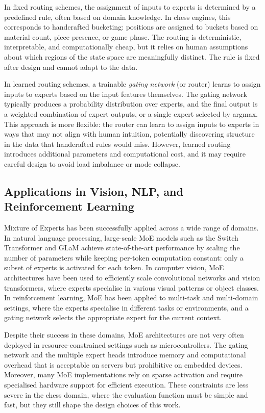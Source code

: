 In fixed routing schemes, the assignment of inputs to experts is determined by a predefined rule, often based on domain knowledge. In chess engines, this corresponds to handcrafted bucketing: positions are assigned to buckets based on material count, piece presence, or game phase. The routing is deterministic, interpretable, and computationally cheap, but it relies on human assumptions about which regions of the state space are meaningfully distinct. The rule is fixed after design and cannot adapt to the data.

In learned routing schemes, a trainable \emph{gating network} (or router) learns to assign inputs to experts based on the input features themselves. The gating network typically produces a probability distribution over experts, and the final output is a weighted combination of expert outputs, or a single expert selected by argmax. This approach is more flexible: the router can learn to assign inputs to experts in ways that may not align with human intuition, potentially discovering structure in the data that handcrafted rules would miss. However, learned routing introduces additional parameters and computational cost, and it may require careful design to avoid load imbalance or mode collapse.


\subsection{Applications in Vision, NLP, and Reinforcement Learning}
Mixture of Experts has been successfully applied across a wide range of domains. In natural language processing, large-scale MoE models such as the Switch Transformer \parencite{fedus2021} and GLaM \parencite{du2022} achieve state-of-the-art performance by scaling the number of parameters while keeping per-token computation constant: only a subset of experts is activated for each token. In computer vision, MoE architectures have been used to efficiently scale convolutional networks and vision transformers, where experts specialise in various visual patterns or object classes. In reinforcement learning, MoE has been applied to multi-task and multi-domain settings, where the experts specialise in different tasks or environments, and a gating network selects the appropriate expert for the current context.

Despite their success in these domains, MoE architectures are not very often deployed in resource-constrained settings such as microcontrollers. The gating network and the multiple expert heads introduce memory and computational overhead that is acceptable on servers but prohibitive on embedded devices. Moreover, many MoE implementations rely on sparse activation and require specialised hardware support for efficient execution. These constraints are less severe in the chess domain, where the evaluation function must be simple and fast, but they still shape the design choices of this work.


